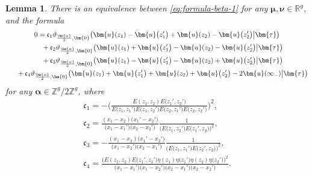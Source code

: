\documentclass[pdftex]{sigma}
\numberwithin{equation}{section}
\newtheorem{Lemma}[Theorem]{Lemma}
\begin{document}
\begin{Lemma}
There is an equivalence between \eqref{eq:formula-beta-1} for any $\bm{\mu},\bm{\nu} \in \mathbb{R}^g$, and the formula
\begin{gather}
	0  = \mathfrak{c}_{1} \vartheta_{\frac{\bm{\alpha}}{2}, \bm{0}}\bigl(\bm{u}(z_1) - \bm{u}\bigl(z_1'\bigr) + \bm{u}(z_2) - \bm{u}\bigl(z_2'\bigr)\big|\bm{\tau}\bigr) \nonumber\\ \hphantom{0 =}{}
+ \mathfrak{c}_{2} \vartheta_{\frac{\bm{\alpha}}{2},\bm{0}}\bigl(\bm{u}(z_1) + \bm{u}\bigl(z_1'\bigr) - \bm{u}(z_2) - \bm{u}\bigl(z_2'\bigr)\big|\bm{\tau}\bigr) \nonumber\\ \hphantom{0 =}{}
+\mathfrak{c}_{3} \vartheta_{\frac{\bm{\alpha}}{2},\bm{0}}\bigl(\bm{u}(z_1) - \bm{u}\bigl(z'_1\bigr) - \bm{u}(z_2) + \bm{u}\bigl(z_2'\bigr)\big|\bm{\tau}\bigr) \nonumber\\ \hphantom{0 =}{}
+ \mathfrak{c}_{4} \vartheta_{\frac{\bm{\alpha}}{2},\bm{0}}\bigl(\bm{u}(z_1) + \bm{u}\bigl(z_1'\bigr)+\bm{u}(z_2)+\bm{u}\bigl(z_2'\bigr) - 2\bm{u}(\infty_-)\big|\bm{\tau}\bigr)\label{eq:equiv-beta-1}
\end{gather}
for any $\bm{\alpha} \in \mathbb{Z}^{g}/2\mathbb{Z}^{g}$, where
\begin{gather*}
\mathfrak{c}_1  = -\Biggl(\frac{E(z_1, z_2)E\bigl(z_1', z_2'\bigr)}{E\bigl(z_1, z_1'\bigr)E\bigl(z_1, z_2'\bigr)E\bigl(z_2, z_1'\bigr)E\bigl(z_2, z_2'\bigr)}\Biggr)^{2}, \\
\mathfrak{c}_2  = \frac{(x_1-x_2)\big(x_1'-x_2'\big)}{\bigl(x_1-x_1'\bigr)\bigl(x_2-x_2'\bigr)}\frac{1}{\bigl(E\bigl(z_1,z_2'\bigr)E\big(z_1', z_2\big)\bigr)^2}, \\
\mathfrak{c}_3  = -\frac{(x_1 - x_2)\big(x_1' -x_2'\big)}{\big(x_1 -x_2'\big)\bigl(x_2-x_1'\bigr)}\frac{1}{\bigl(E\bigl(z_1, z_1'\bigr)E\big(z_2', z_2\big)\bigr)^2}, \\
\mathfrak{c}_4  = \frac{\bigl(E(z_1, z_2)E\bigl(z_1', z_2'\bigr)\eta(z_1)\eta\bigl(z_1'\bigr)\eta(z_2)\eta\bigl(z_2'\bigr)\bigr)^{2}}{\bigl(x_1-x_1'\bigr)\bigl(x_1-x_2'\bigr)\bigl(x_2-x_1'\bigr)\bigl(x_2-x_2'\bigr)}.
\end{gather*}
\end{Lemma}
\end{document}
